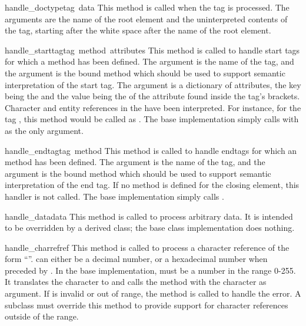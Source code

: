 \begin{funcdesc}{handle_doctype}{tag\, data}
This method is called when the  tag is processed.
The arguments are the name of the root element and the uninterpreted
contents of the tag, starting after the white space after the name of
the root element.
\end{funcdesc}

\begin{funcdesc}{handle_starttag}{tag\, method\, attributes}
This method is called to handle start tags for which a
 method has been defined.  The 
argument is the name of the tag, and the  argument is the
bound method which should be used to support semantic interpretation
of the start tag.  The  argument is a dictionary of
attributes, the key being the  and the value being the
 of the attribute found inside the tag's \code{<>} brackets.
Character and entity references in the  have
been interpreted.  For instance, for the tag
, this method would be called as
.
The base implementation simply calls  with 
as the only argument.
\end{funcdesc}

\begin{funcdesc}{handle_endtag}{tag\, method}
This method is called to handle endtags for which an
 method has been defined.  The 
argument is the name of the tag, and the
 argument is the bound method which should be used to
support semantic interpretation of the end tag.  If no
 method is defined for the closing element, this
handler is not called.  The base implementation simply calls
.
\end{funcdesc}

\begin{funcdesc}{handle_data}{data}
This method is called to process arbitrary data.  It is intended to be
overridden by a derived class; the base class implementation does
nothing.
\end{funcdesc}

\begin{funcdesc}{handle_charref}{ref}
This method is called to process a character reference of the form
``''.   can either be a decimal number,
or a hexadecimal number when preceded by .
In the base implementation,  must be a number in the
range 0-255.  It translates the character to \ASCII{} and calls the
method  with the character as argument.  If
 is invalid or out of range, the method
 is called to handle the error.  A
subclass must override this method to provide support for character
references outside of the \ASCII{} range.
\end{funcdesc}

